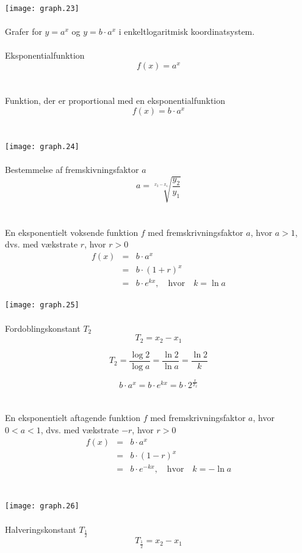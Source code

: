 \documentclass[11pt,a5paper,fleqn,leqno]{book}
\begin{document}
\texttt{[image: graph.23]}
\\
\\
Grafer for $y = a^x$ og $y = b \cdot a^x$ i enkeltlogaritmisk koordinatsystem.
\\
\\
Eksponentialfunktion
\begin{equation}
f(x) = a^x
\end{equation}
\\
\\
Funktion, der er proportional med en eksponentialfunktion
\begin{equation}
f(x) = b \cdot a^x
\end{equation}
\\
\\
\texttt{[image: graph.24]}
\\
\\
Bestemmelse af fremskivningsfaktor $a$
\begin{equation}
a = \sqrt[x_2-x_1]{\frac{y_2}{y_1}}
\end{equation}
\\
\\
En eksponentielt voksende funktion $f$ med fremskrivningsfaktor $a$, hvor $a > 1$, dvs. med vækstrate $r$, hvor $r > 0$
\begin{eqnarray}
f(x) & = & b \cdot a^x \\
 & = & b \cdot (1+r)^x \nonumber \\
 & = & b \cdot e^{kx}, \quad \text{hvor} \quad k = \ln a \nonumber
\end{eqnarray}

\newpage

\texttt{[image: graph.25]}
\\
\\
Fordoblingskonstant $T_2$
\begin{equation}
T_2 = x_2 - x_1
\end{equation}

\begin{equation}
T_2 = \frac{\log 2}{\log a} = \frac{\ln 2}{\ln a} = \frac{\ln 2}{k}
\end{equation}

\begin{equation}
b \cdot a^x = b \cdot e^{kx} = b \cdot 2^{\frac{x}{T_2}}
\end{equation}
\\
\\
En eksponentielt aftagende funktion $f$ med fremskrivningsfaktor $a$, hvor $0 < a < 1$, dvs. med vækstrate $-r$, hvor $r > 0$
\begin{eqnarray}
f(x) & = & b \cdot a^x \\
 & = & b \cdot (1-r)^x \nonumber \\
 & = & b \cdot e^{-kx}, \quad \text{hvor} \quad k = -\ln a \nonumber
\end{eqnarray}
\\
\\
\texttt{[image: graph.26]}
\\
\\
Halveringskonstant $T_{\frac{1}{2}}$
\begin{equation}
T_{\frac{1}{2}} = x_2 - x_1
\end{equation}
\end{document}
